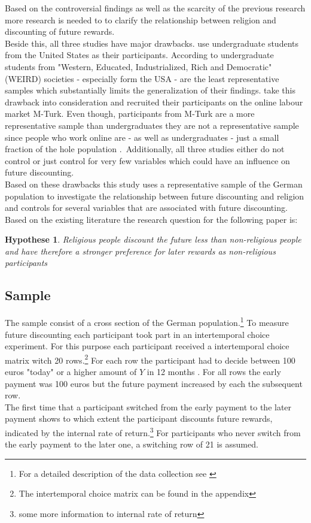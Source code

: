 \documentclass[12pt,a4paper]{article}
\newtheorem{hyp}{Hypothese}
\begin{document}
Based on the controversial findings as well as the scarcity of the previous research more research is needed to to clarify the relationship between religion and discounting of future rewards.\\
Beside this, all three studies have major drawbacks. \textcite{carter2012religious, benjamin2010religious} use undergraduate students from the United States as their participants. According to \textcite{henrich2010weirdest} undergraduate students from "Western, Educated, Industrialized, Rich and Democratic" (WEIRD) societies - especially form the USA - are the least representative samples which substantially limits the generalization of their findings. \textcite{thornton2015divine} take this drawback into consideration and recruited their participants on the online labour market M-Turk. Even though, participants from M-Turk are a more representative sample than undergraduates they are not a representative sample since people who work online are - as well as undergraduates - just a small fraction of the hole population \parencite{horton2011online}.\
Additionally, all three studies either do not control or just control for very few variables which could have an influence on future discounting.\\

Based on these drawbacks this study uses a representative sample of the German population to investigate the relationship between future discounting and religion and controls for several variables that are associated with future discounting.
Based on the existing literature the research question for the following paper is: 
\begin{hyp}
Religious people discount the future less than non-religious people and have therefore a stronger preference for later rewards as non-religious participants
\end{hyp}

\subsection{Sample} 
The sample consist of a cross section of the German population.\footnote{For a detailed description of the data collection see \textcite{dohmen2010risk}} To measure future discounting each participant took part in an intertemporal choice experiment. For this purpose each participant received a intertemporal choice matrix witch 20 rows.\footnote{The intertemporal choice matrix can be found in the appendix} For each row the participant had to decide between 100 euros "today" or a higher amount of $Y$ in 12 months \parencite{dohmen2010risk}. For all rows the early payment was 100 euros but the future payment increased by each the subsequent row.\\
The first time that a participant switched from the early payment to the later payment shows to which extent the participant discounts future rewards, indicated by the internal rate of return.\footnote{some more information to internal rate of return} For participants who never switch from the early payment to the later one, a switching row of 21 is assumed.\\  
\end{document}
